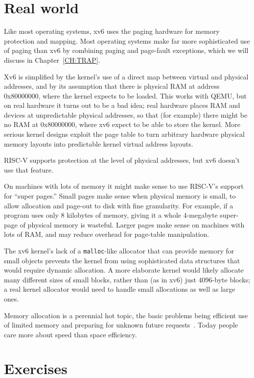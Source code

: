 \section{Real world}

Like most operating systems, xv6 uses the paging hardware for memory
protection and mapping.  Most operating systems make far more
sophisticated use of paging than xv6 by combining paging and
page-fault exceptions, which we will discuss in
Chapter~\ref{CH:TRAP}.

Xv6 is simplified by the kernel's use of a direct map between virtual
and physical addresses, and by its assumption that there is physical
RAM at address 0x80000000, where the kernel expects to be loaded. This
works with QEMU, but on real hardware it turns out to be a bad idea;
real hardware places RAM and devices at unpredictable physical
addresses, so that (for example) there might be no RAM at 0x80000000,
where xv6 expect to be able to store the kernel. More serious kernel
designs exploit the page table to turn arbitrary hardware physical
memory layouts into predictable kernel virtual address layouts.

RISC-V supports protection at the level of physical addresses,
but xv6 doesn't use that feature.

On machines with lots of memory
it might make sense to use
RISC-V's support for ``super pages.''
Small pages make sense
when physical memory is small, to allow allocation and page-out to disk
with fine granularity.
For example, if a program
uses only 8 kilobytes of memory, giving it a whole 4-megabyte super-page
of physical memory is wasteful.
Larger pages make sense on machines with lots of RAM,
and may reduce overhead for page-table manipulation.

The xv6 kernel's lack of a {\tt malloc}-like allocator that can
provide memory for small objects prevents the kernel from using
sophisticated data structures that would require dynamic allocation.
A more elaborate kernel
would likely allocate many different sizes of small blocks,
rather than (as in xv6) just 4096-byte blocks;
a real kernel
allocator would need to handle small allocations as well as large
ones.

Memory allocation is a perennial hot topic, the basic problems being
efficient use of limited memory and
preparing for unknown future requests~\cite{knuth}.  Today people care more about speed than
space efficiency.
\section{Exercises}

